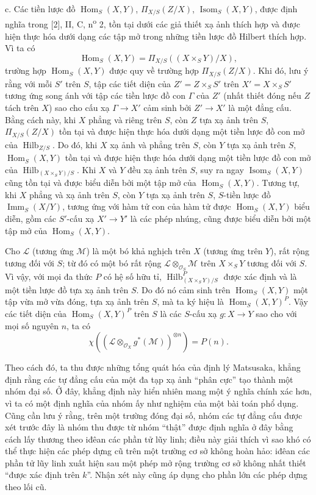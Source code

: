 \medskip
\noindent c. Các tiền lược đồ $\operatorname{Hom}_S(X,Y)$,
$\Pi_{X/S}(Z/X)$, $\operatorname{Isom}_S(X,Y)$, được định nghĩa trong [2], II,
C, n\textsuperscript{o} 2, tồn tại dưới các giả thiết xạ ảnh thích hợp và được
hiện thực hóa dưới dạng các tập mở trong những tiền lược đồ Hilbert thích hợp.
Vì ta có
\[
\operatorname{Hom}_S(X,Y)=\Pi_{X/S}((X\times_SY)/X),
\]
trường hợp $\operatorname{Hom}_S(X,Y)$ được quy về trường hợp
$\Pi_{X/S}(Z/X)$. Khi đó, lưu ý rằng với mỗi $S'$ trên $S$, tập các tiết diện
của $Z'=Z\times_SS'$ trên $X'=X\times_SS'$ tương ứng song ánh với tập các tiền
lược đồ con $\Gamma$ của $Z'$ (nhất thiết đóng nếu $Z$ tách trên $X$) sao cho
cấu xạ $\Gamma\longrightarrow X'$ cảm sinh bởi $Z'\longrightarrow X'$ là một
đẳng cấu. Bằng cách này,
khi $X$ phẳng và riêng trên $S$, còn $Z$ tựa xạ ảnh trên $S$,
$\Pi_{X/S}(Z/X)$ tồn tại và được hiện thực hóa dưới dạng một tiền lược đồ con mở của
$\operatorname{Hilb}_{Z/S}$. Do đó, khi $X$ xạ ảnh và phẳng trên $S$, còn $Y$
tựa xạ ảnh trên $S$, $\operatorname{Hom}_S(X,Y)$ tồn tại và được hiện thực hóa
dưới dạng một tiền lược đồ con mở của
$\operatorname{Hilb}_{(X\times_SY)/S}$. Khi $X$ và $Y$ đều xạ ảnh trên $S$,
suy ra ngay $\operatorname{Isom}_S(X,Y)$ cũng tồn tại và được biểu diễn bởi
một tập mở của $\operatorname{Hom}_S(X,Y)$. Tương tự, khi $X$ phẳng và xạ ảnh
trên $S$, còn $Y$ tựa xạ ảnh trên $S$, $S$-tiền lược đồ
$\operatorname{Imm}_S(X/Y)$, tương ứng với hàm tử con của hàm tử được
$\operatorname{Hom}_S(X,Y)$ biểu diễn, gồm các $S'$-cấu xạ
$X'\longrightarrow Y'$ là các phép nhúng, cũng được biểu diễn bởi một tập mở
của $\operatorname{Hom}_S(X,Y)$.

Cho $\mathcal L$ (tương ứng $\mathcal M$) là một bó khả nghịch trên $X$ (tương
ứng trên $Y$), rất rộng tương đối với $S$; từ đó có một bó rất rộng
$\mathcal L\otimes_{\mathcal O_S}\mathcal M$ trên $X\times_SY$ tương đối với
$S$. Vì vậy, với mọi đa thức $P$ có hệ số hữu tỉ,
$\operatorname{Hilb}^P_{(X\times_SY)/S}$ được xác định và là một tiền lược đồ
tựa xạ ảnh trên $S$. Do đó nó cảm sinh trên $\operatorname{Hom}_S(X,Y)$ một
tập vừa mở vừa đóng, tựa xạ ảnh trên $S$, mà ta ký hiệu là
$\operatorname{Hom}_S(X,Y)^P$. Vậy các tiết diện của
$\operatorname{Hom}_S(X,Y)^P$ trên $S$ là các $S$-cấu xạ
$g:X\longrightarrow Y$ sao cho với mọi số nguyên $n$, ta có
\[
\chi\!\left(\left(\mathcal L\otimes_{\mathcal O_X}g^*(\mathcal M)\right)^{
\otimes n}\right)=P(n).
\]

Theo cách đó, ta thu được những tổng quát hóa của định lý Matsusaka, khẳng định
rằng các tự đẳng cấu của một đa tạp xạ ảnh ``phân cực'' tạo thành một nhóm đại
số. Ở đây, khẳng định này hiển nhiên mang một ý nghĩa chính xác hơn, vì ta có
một định nghĩa của nhóm ấy như nghiệm của một bài toán phổ dụng. Cũng cần lưu ý
rằng, trên một trường đóng đại số, nhóm các tự đẳng cấu được xét trước đây là
nhóm thu được từ nhóm ``thật'' được định nghĩa ở đây bằng cách lấy thương theo
iđêan các phần tử lũy linh; điều này giải thích vì sao khó có thể thực hiện các
phép dựng cũ trên một trường cơ sở không hoàn hảo: iđêan các phần
tử lũy linh xuất hiện sau một phép mở rộng trường cơ sở không nhất thiết
``được xác định trên $k$''. Nhận xét này cũng áp dụng cho phần lớn các phép dựng
theo lối cũ.

